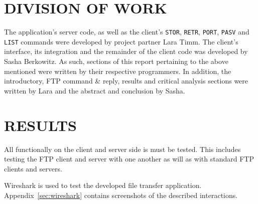 \documentclass[10pt,twocolumn]{witseiepaper}
\begin{document}


\section{DIVISION OF WORK}
The application's server code, as well as the client's \texttt{STOR}, \texttt{RETR}, \texttt{PORT}, \texttt{PASV} and \texttt{LIST} commands were developed by project partner Lara Timm. The client's interface, its integration and the remainder of the client code was developed by Sasha Berkowitz. As such, sections of this report pertaining to the above mentioned were written by their respective programmers. In addition, the introductory, FTP command \& reply, results and critical analysis sections were written by Lara and the abstract and conclusion by Sasha.
\section{RESULTS}\label{results}

All functionally on the client and server side is must be tested. This includes testing the FTP client and server with one another as will as with standard FTP clients and servers.


Wireshark is used to test the developed file transfer application. Appendix~\ref{sec:wireshark} contains screenshots of the described interactions. 
\end{document}
